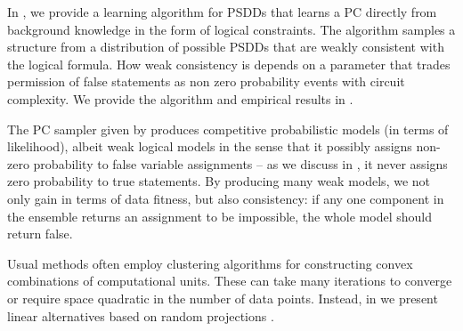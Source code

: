 
In \citet{geh21a}, we provide a learning algorithm for PSDDs that learns a PC directly from
background knowledge in the form of logical constraints. The algorithm samples a structure from a
distribution of possible PSDDs that are weakly consistent with the logical formula. How weak
consistency is depends on a parameter that trades permission of false statements as non zero
probability events with circuit complexity. We provide the algorithm and empirical results in
.


The PC sampler given by \citet{geh21a} produces competitive probabilistic models (in terms of
likelihood), albeit weak logical models in the sense that it possibly assigns non-zero probability
to false variable assignments -- as we discuss in , it never assigns zero
probability to true statements. By producing many weak models, we not only gain in terms of data
fitness, but also consistency: if any one component in the ensemble returns an assignment to be
impossible, the whole model should return false.


Usual methods often employ clustering algorithms for constructing convex combinations of
computational units. These can take many iterations to converge or require space quadratic in the
number of data points. Instead, in  we present linear alternatives based on random
projections \citep{dasgupta08a,dasgupta08b}.
